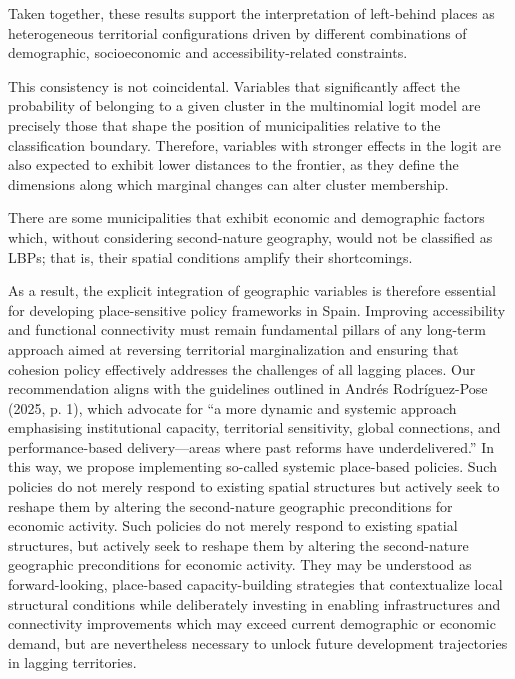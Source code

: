 \documentclass[a4paper,11pt,oneside]{article}
\begin{document}
Taken together, these results support the interpretation of left-behind places as heterogeneous territorial configurations driven by different combinations of demographic, socioeconomic and accessibility-related constraints.

This consistency is not coincidental. Variables that significantly affect the probability of belonging to a given cluster in the multinomial logit model are precisely those that shape the position of municipalities relative to the classification boundary. Therefore, variables with stronger effects in the logit are also expected to exhibit lower distances to the frontier, as they define the dimensions along which marginal changes can alter cluster membership.

There are some municipalities that exhibit economic and demographic factors which, without considering second-nature geography, would not be classified as LBPs; that is, their spatial conditions amplify their shortcomings.

As a result, the explicit integration of geographic variables is therefore essential for developing place-sensitive policy frameworks in Spain. Improving accessibility and functional connectivity must remain fundamental pillars of any long-term approach aimed at reversing territorial marginalization and ensuring that cohesion policy effectively addresses the challenges of all lagging places. Our recommendation aligns with the guidelines outlined in Andrés Rodríguez-Pose (2025, p. 1), which advocate for “a more dynamic and systemic approach emphasising institutional capacity, territorial sensitivity, global connections, and performance-based delivery—areas where past reforms have underdelivered.” In this way, we propose implementing so-called systemic place-based policies. Such policies do not merely respond to existing spatial structures but actively seek to reshape
them by altering the second-nature geographic preconditions for economic activity. Such policies do not merely respond to existing spatial structures, but actively seek to reshape them by altering the second-nature geographic preconditions for economic activity. They may be understood as forward-looking, place-based capacity-building strategies that contextualize local structural conditions while deliberately investing in enabling infrastructures and connectivity improvements which may exceed current demographic or economic demand, but are nevertheless necessary to unlock future development trajectories in lagging territories.
\end{document}
